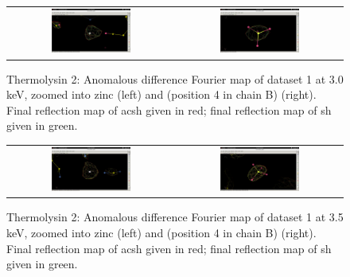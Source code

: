 \begin{figure}
    \centering
    \begin{tabular}{cc}
        \includegraphics[trim={11cm 7cm 11cm 7cm},clip, width=0.5\textwidth]{images/Screenshot (69).png} & \includegraphics[trim={11cm 3cm 11cm 11cm},clip, width=0.5\textwidth]{images/Screenshot (70).png} %
    \end{tabular}
    \caption{Thermolysin 2: Anomalous difference Fourier map of dataset 1 at 3.0 \unit{keV}, zoomed into zinc (left) and  (position 4 in chain B) (right). Final reflection map of \ac{acsh} given in red; final reflection map of \ac{sh} given in green.}
    \label{fig:anom_diff_3p0}
\end{figure}


\begin{figure}
    \centering
    \begin{tabular}{cc}
        \includegraphics[trim={11cm 7cm 11cm 7cm},clip, width=0.5\textwidth]{images/Screenshot (68).png} & \includegraphics[trim={11cm 5cm 11cm 9cm},clip, width=0.5\textwidth]{images/Screenshot (66).png} %
    \end{tabular}
    \caption{Thermolysin 2: Anomalous difference Fourier map of dataset 1 at 3.5 \unit{keV}, zoomed into zinc (left) and  (position 4 in chain B) (right). Final reflection map of \ac{acsh} given in red; final reflection map of \ac{sh} given in green.}
    \label{fig:anom_diff_3p5}
\end{figure}


